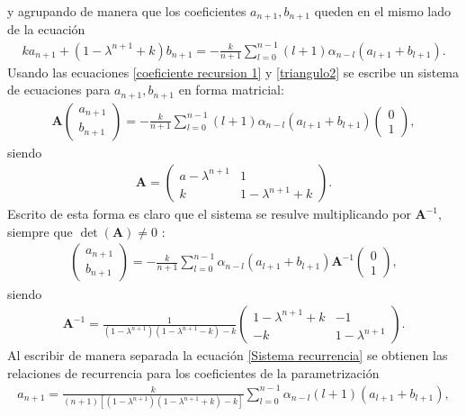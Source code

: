 y agrupando de manera que los coeficientes $a_{n+1},b_{n+1}$ queden en el mismo lado de la ecuación
\begin{eqnarray}
k a_{n+1}+(1-\lambda^{n+1}+k)b_{n+1}=-\frac{k}{n+1}\sum_{l=0}^{n-1}(l+1)\alpha_{n-l}
(a_{l+1}+b_{l+1}).
\label{triangulo2}
\end{eqnarray}
Usando las ecuaciones \eqref{coeficiente recursion 1} y \eqref{triangulo2} se escribe un sistema de ecuaciones para $a_{n+1},b_{n+1}$ en forma matricial:
\begin{eqnarray}
\mathbf{A}\begin{pmatrix}
a_{n+1}\\
b_{n+1}
\end{pmatrix}=-\frac{k}{n+1}\sum_{l=0}^{n-1}(l+1)\alpha_{n-l}(a_{l+1}+b_{l+1})\begin{pmatrix}
0\\
1
\end{pmatrix},
\label{sistema recurrencia}
\end{eqnarray}
siendo 
\begin{eqnarray}
\mathbf{A}=\begin{pmatrix}
a-\lambda^{n+1} & 1 \\
k & 1-\lambda^{n+1}+k
\end{pmatrix}.
\end{eqnarray}
Escrito de esta forma es claro que el sistema se resulve multiplicando por $\mathbf{A}^{-1}$, siempre que $\det(\mathbf{A})\neq 0$ :
\begin{eqnarray}
\begin{pmatrix}
a_{n+1}\\
b_{n+1}
\end{pmatrix}=-\frac{k}{n+1}\sum_{l=0}^{n-1}\alpha_{n-l}(a_{l+1}+b_{l+1})\mathbf{A}^{-1}\begin{pmatrix}
0\\
1
\end{pmatrix},
\label{Sistema recurrencia}
\end{eqnarray}
siendo
\begin{eqnarray}
\mathbf{A}^{-1}=\frac{1}{(1-\lambda^{n+1})(1-\lambda^{n+1}-k)-k}\begin{pmatrix}
1-\lambda^{n+1}+k & -1\\
-k & 1-\lambda^{n+1}
\end{pmatrix}.
\end{eqnarray}
Al escribir de manera separada la ecuación \eqref{Sistema recurrencia} se obtienen las relaciones de recurrencia para los coeficientes de la parametrización
\begin{eqnarray}
a_{n+1}=\frac{k}{(n+1)[(1-\lambda^{n+1})(1-\lambda^{n+1}+k)-k]}\sum_{l=0}^{n-1}\alpha_{n-l}(l+1)(a_{l+1}+b_{l+1}),
\end{eqnarray}
